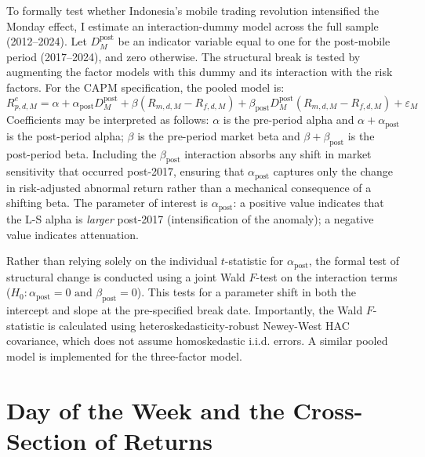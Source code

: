 \documentclass[
	a4paper,
	10pt,
	twoside,
]{LTJournalArticle}
\begin{document}
To formally test whether Indonesia's mobile trading revolution intensified the Monday effect, I estimate an interaction-dummy model across the full sample (2012--2024). Let $D^{\text{post}}_M$ be an indicator variable equal to one for the post-mobile period (2017--2024), and zero otherwise. The structural break is tested by augmenting the factor models with this dummy and its interaction with the risk factors. For the CAPM specification, the pooled model is:
\begin{equation}
	R^{e}_{p, d, M} = \alpha + \alpha_{\text{post}} D^{\text{post}}_M + \beta (R_{m, d, M} - R_{f, d, M}) + \beta_{\text{post}} D^{\text{post}}_M (R_{m, d, M} - R_{f, d, M}) + \varepsilon_M
	\label{eq:break_capm}
\end{equation}
Coefficients may be interpreted as follows: $\alpha$ is the pre-period alpha and $\alpha + \alpha_{\text{post}}$ is the post-period alpha; $\beta$ is the pre-period market beta and $\beta + \beta_{\text{post}}$ is the post-period beta. Including the $\beta_{\text{post}}$ interaction absorbs any shift in market sensitivity that occurred post-2017, ensuring that $\alpha_{\text{post}}$ captures only the change in risk-adjusted abnormal return rather than a mechanical consequence of a shifting beta. The parameter of interest is $\alpha_{\text{post}}$: a positive value indicates that the L-S alpha is \textit{larger} post-2017 (intensification of the anomaly); a negative value indicates attenuation.

Rather than relying solely on the individual $t$-statistic for $\alpha_{\text{post}}$, the formal test of structural change is conducted using a joint Wald $F$-test on the interaction terms ($H_0\colon \alpha_{\text{post}} = 0 \text{ and } \beta_{\text{post}} = 0$). This tests for a parameter shift in both the intercept and slope at the pre-specified break date. Importantly, the Wald $F$-statistic is calculated using heteroskedasticity-robust Newey-West HAC covariance, which does not assume homoskedastic i.i.d. errors. A similar pooled model is implemented for the three-factor model.



\section{Day of the Week and the Cross-Section of Returns}
\end{document}
